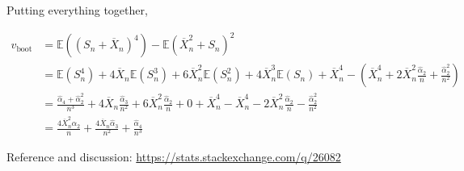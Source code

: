 Putting everything together,

\begin{align*}
v_\text{boot} &= \mathbb{E}\left( (S_{n} + \overline{X}_{n})^{4} \right) - \mathbb{E}\left(\overline{X}_{n}^{2} + S_{n}\right)^{2} \\
&= \mathbb{E}(S_{n}^{4}) + 4 \overline{X}_{n} \mathbb{E}(S_{n}^{3}) + 6 \overline{X}_{n}^{2} \mathbb{E}(S_{n}^{2}) + 4 \overline{X}_{n}^{3} \mathbb{E}(S_{n}) + \overline{X}_{n}^{4} - \left( \overline{X}_{n}^{4} + 2 \overline{X}_{n}^{2} \frac{\hat{\alpha}_{2}}{n} + \frac{\hat{\alpha}_{2}^{2}}{n^{2}}\right) \\
&= \frac{\hat{\alpha}_{4} + \hat{\alpha}_{2}^{2}}{n^{3}} + 4 \overline{X}_{n} \frac{\hat{\alpha}_{3}}{n^{2}} + 6 \overline{X}_{n}^{2} \frac{\hat{\alpha}_{2}}{n} + 0 + \overline{X}_{n}^{4} - \overline{X}_{n}^{4} - 2 \overline{X}_{n}^{2} \frac{\hat{\alpha}_{2}}{n} - \frac{\hat{\alpha}_{2}^{2}}{n^{2}} \\
&= \frac{4 \overline{X}_{n}^{2} \hat{\alpha}_{2}}{n} + \frac{4 \overline{X}_{n} \hat{\alpha}_{3}}{n^{2}} + \frac{\hat{\alpha}_{4}}{n^{3}}
\end{align*}

Reference and discussion: \url{https://stats.stackexchange.com/q/26082}

